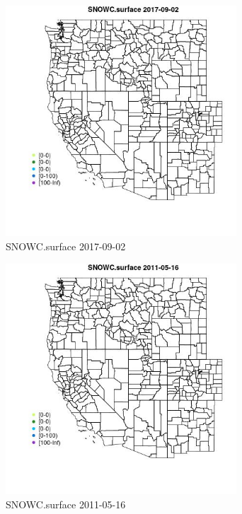 \begin{figure} 
\centering  
\includegraphics[width=0.77\textwidth]{Code_Outputs/Report_ML_input_PM25_Step4_part_e_de_duplicated_aveswNAs_MapObsSNOWCsurface2017-09-02.jpg} 
\caption{\label{fig:Report_ML_input_PM25_Step4_part_e_de_duplicated_aveswNAsMapObsSNOWCsurface2017-09-02}SNOWC.surface 2017-09-02} 
\end{figure} 
 

\begin{figure} 
\centering  
\includegraphics[width=0.77\textwidth]{Code_Outputs/Report_ML_input_PM25_Step4_part_e_de_duplicated_aveswNAs_MapObsSNOWCsurface2011-05-16.jpg} 
\caption{\label{fig:Report_ML_input_PM25_Step4_part_e_de_duplicated_aveswNAsMapObsSNOWCsurface2011-05-16}SNOWC.surface 2011-05-16} 
\end{figure} 
 

